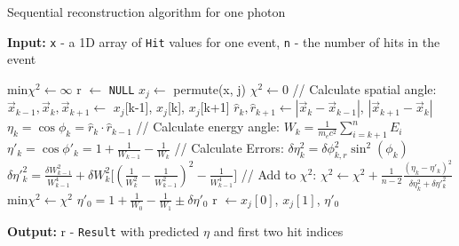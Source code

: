 \begin{algorithm}
\caption{Sequential reconstruction algorithm for one photon}\label{alg:seq}
\hspace{\algorithmicindent} \textbf{Input:} \texttt{x} - a 1D array of \texttt{Hit} values for one event, \texttt{n} - the number of hits in the event
\begin{algorithmic}[1]
    \State min$\chi^2 \gets \infty$ 
    \State r $\gets$ \texttt{NULL} 
    \State
     
        \State $x_j \gets$ permute(x, j) 
        \State
        \State $\chi^2 \gets 0$
         
            \State // Calculate spatial angle: \label{ln:startx}
            \State $\vec{x}_{k-1}, \vec{x}_k, \vec{x}_{k+1} \gets$ $x_j$[k-1], $x_j$[k], $x_j$[k+1] 
            \State $\hat{r}_k, \hat{r}_{k+1} \gets |\vec{x}_{k} - \vec{x}_{k-1}|$, $|\vec{x}_{k+1}-\vec{x}_{k}|$  \label{ln:endx}
            \State $\eta_k = \cos{\phi_k} = \hat{r}_k\cdot\hat{r}_{k-1}$ 
            \State
            \State // Calculate energy angle:
            \State $W_k = \frac{1}{m_e c^2}\sum_{i=k+1}^n E_i$ 
            \State $\eta'_k = \cos{\phi'_k} = 1 + \frac{1}{W_{k-1}}-\frac{1}{W_k}$ 
            \State
            \State // Calculate Errors:
            \State $\delta\eta_k^2 = \delta\phi_{k,r}^2\sin^2(\phi_k)$ 
            \State $\delta\eta'^2_k = \frac{\delta W_{k-1}^2}{W_{k-1}^4}+\delta W_k^2 \big[(\frac{1}{W_k^2}-\frac{1}{W_{k-1}^2})^2 - \frac{1}{W_{k-1}^4}\big]$ 
            \State
            \State // Add to $\chi^2$:
            \State $\chi^2 \gets \chi^2 + \frac{1}{n-2} \frac{(\eta_k-\eta'_k)^2}{\delta\eta_k^2 + \delta\eta'^2_k}$
        \EndFor
        \State
         
        \State min$\chi^2 \gets \chi^2$
        \State $\eta'_0 = 1 + \frac{1}{W_0}-\frac{1}{W_1} \pm \delta\eta'_0$ 
        \State r $\gets x_j[0]$, $x_j[1]$, $\eta'_0$ 
        \EndIf
        \State
    \EndFor
    \State
\end{algorithmic}
\hspace{\algorithmicindent} \textbf{Output:} r - \texttt{Result} with predicted $\eta$ and first two hit indices
\end{algorithm}

